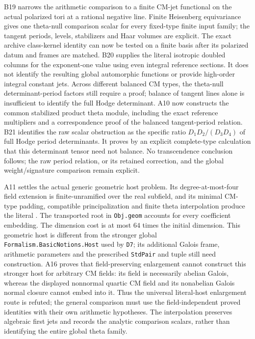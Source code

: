 \documentclass[11pt]{article}
\theoremstyle{definition}\newtheorem{definition}[theorem]{Definition}\newtheorem{remark}[theorem]{Remark}
\begin{document}
B19 narrows the arithmetic comparison to a finite CM-jet
functional on the actual polarized tori at a rational negative
line. Finite Heisenberg equivariance gives one theta-null
comparison scalar for every fixed-type finite input family;
the tangent periods, levels, stabilizers and Haar volumes are
explicit. The exact archive class-kernel identity can now be
tested on a finite basis after its polarized datum and frames
are matched. B20 supplies the literal isotropic doubled columns
for the exponent-one value using even integral reference sections.
It does not identify the resulting global automorphic functions
or provide high-order integral constant jets. Across different
balanced CM types, the theta-null determinant-period factors
still require a proof; balance of tangent lines alone is
insufficient to identify the full Hodge determinant.
A10 now constructs the common stabilized product theta module,
including the exact reference multipliers and a correspondence
proof of the balanced tangent-period relation. B21 identifies
the raw scalar obstruction as the specific ratio
$D_1D_2/(D_3D_4)$ of full Hodge period determinants. It proves
by an explicit complete-type calculation that this determinant
tensor need not balance. No transcendence conclusion follows;
the raw period relation, or its retained correction, and the
global weight/signature comparison remain explicit.

A11 settles the actual generic geometric host problem. Its
degree-at-most-four field extension is finite-unramified over
the real subfield, and its minimal CM-type padding, compatible
principalization and finite theta interpolation produce the
literal . The transported root
in \texttt{Obj.geom} accounts for every coefficient embedding.
The dimension cost is at most $64$ times the initial dimension.
This geometric host is different from the stronger global
\nolinkurl{Formalism.BasicNotions.Host} used by \texttt{D7};
its additional Galois frame, arithmetic parameters and the
prescribed \texttt{StdPair} and tuple still need construction.
A16 proves that field-preserving enlargement cannot construct this
stronger host for arbitrary CM fields: its field is necessarily
abelian Galois, whereas the displayed nonnormal quartic CM field
and its nonabelian Galois normal closure cannot embed into it.
Thus the universal literal-host enlargement route is refuted;
the general comparison must use the field-independent proved
identities with their own arithmetic hypotheses.
The interpolation preserves algebraic first jets and records
the analytic comparison scalars, rather than identifying the
entire global theta family.
\end{document}
